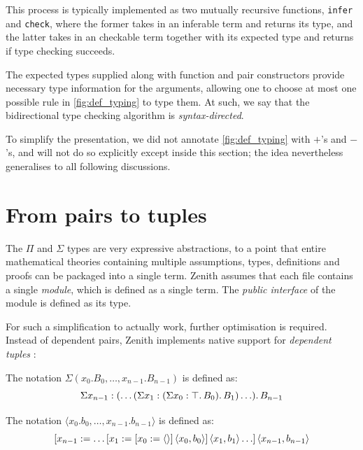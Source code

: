 \documentclass[twoside]{report}
\begin{document}
This process is typically implemented as two mutually recursive functions, \texttt{infer} and \texttt{check}, where the former takes in an inferable term and returns its type, and the latter takes in an checkable term together with its expected type and returns if type checking succeeds.

The expected types supplied along with function and pair constructors provide necessary type information for the arguments, allowing one to choose at most one possible rule in \cref{fig:def_typing} to type them. At such, we say that the bidirectional type checking algorithm is \emph{syntax-directed}.

To simplify the presentation, we did not annotate \cref{fig:def_typing} with $+$'s and $-$'s, and will not do so explicitly except inside this section; the idea nevertheless generalises to all following discussions.

\section{From pairs to tuples}
\label{sec:from_pairs_to_tuples}

The $\Pi$ and $\Sigma$ types are very expressive abstractions, to a point that entire mathematical theories containing multiple assumptions, types, definitions and proofs can be packaged into a single term. Zenith assumes that each file contains a single \emph{module}, which is defined as a single term. The \emph{public interface} of the module is defined as its type.

For such a simplification to actually work, further optimisation is required. Instead of dependent pairs, Zenith implements native support for \emph{dependent tuples} \cite{pollack2000dependently}:

\begin{definition}
    \label{def:dependent_tuple_types}
    The notation $\Sigma(x_0. B_0, \ldots, x_{n-1}. B_{n-1})$ is defined as: $$\Sigma{x_{n-1}} : {(\ldots (\Sigma{x_1} : {(\Sigma{x_0} : {\top}.\,{B_0})}.\,{B_1}) \ldots)}.\,{B_{n-1}}$$
\end{definition}

\begin{definition}
    \label{def:dependent_tuple_constructors}
    The notation $\langle x_0. b_0, \ldots, x_{n-1}. b_{n-1}\rangle$ is defined as: $$[{x_{n-1}}:={\ldots [{x_1}:={[{x_0}:={\langle\rangle}]\,{\langle{x_0}, {b_0}\rangle}}]\,{\langle{x_1}, {b_1}\rangle} \ldots}]\,{\langle{x_{n-1}}, {b_{n-1}}\rangle}$$
\end{definition}
\end{document}

